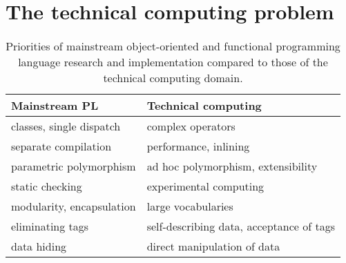 

\section{The technical computing problem}
\label{sec:tcproblem}

\begin{singlespace}
\begin{table}
  \begin{center}
    \def\arraystretch{1.25}
    \begin{tabular}{|l|l|}\hline
      \textbf{Mainstream PL} & \textbf{Technical computing} \\
      \hline \hline
      classes, single dispatch             &  complex operators \\
      \hline
      separate compilation                 &  performance, inlining \\
      \hline
      parametric polymorphism              &  ad hoc polymorphism, extensibility \\
      \hline
      static checking                      &  experimental computing \\
      \hline
      modularity, encapsulation            &  large vocabularies \\
      \hline
      eliminating tags                     &  self-describing data, acceptance of tags \\
      \hline
      data hiding                          &  direct manipulation of data \\
      \hline
    \end{tabular}
  \end{center}
  \caption[Programming language priorities]{
\small{
Priorities of mainstream object-oriented and functional programming language research and
implementation compared to those of the technical computing domain.
}
  }
  \label{PLpriorities}
\end{table}
\end{singlespace}


